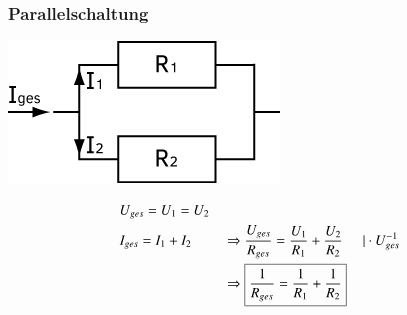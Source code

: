 \documentclass[11pt]{article}
\begin{document}
	\subsubsection{Parallelschaltung}
	\begin{center}
		\includegraphics[width=0.5\linewidth]{skizzen/15/15_4-6/15_5B3}
	\end{center}
	\noindent
	\begin{align*}
		&U_{ges} = U_1 = U_2 && \\
		&I_{ges} = I_1 + I_2 &&\Rightarrow \frac{U_{ges}}{R_{ges}} = \frac{U_1}{R_1} + \frac{U_2}{R_2} \hspace{5mm} |\cdot U_{ges}^{-1} \\
		& &&\Rightarrow \boxed{\frac{1}{R_{ges}} = \frac{1}{R_1} + \frac{1}{R_2} } 
	\end{align*}
	
\end{document}

